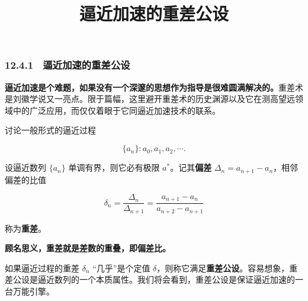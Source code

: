 \documentclass[
  10pt,
  fontset=fandol]{ctexart}
\title{逼近加速的重差公设}
\author{}
\date{}
\begin{document}
\maketitle

\subsubsection{12.4.1　逼近加速的重差公设}\label{ux903cux8fd1ux52a0ux901fux7684ux91cdux5deeux516cux8bbe}

\textbf{逼近加速是个难题，如果没有一个深邃的思想作为指导是很难圆满解决的。}重差术是刘徽学说又一亮点。限于篇幅，这里避开重差术的历史渊源以及它在测高望远领域中的广泛应用，而仅仅着眼于它同逼近加速技术的联系。

讨论一般形式的逼近过程

\[
\{a_n\}:a_0,a_1,a_2,\cdots.
\]

设逼近数列 \(\{a_n\}\) 单调有界，则它必有极限 \(a^*\)。记其\textbf{偏差} \(\Delta_n=a_{n+1}-a_n\)，相邻偏差的比值

\[
\delta_n=\frac{\Delta_n}{\Delta_{n+1}}=\frac{a_{n+1}-a_n}{a_{n+2}-a_{n+1}}
\]

称为\textbf{重差}。

\textbf{顾名思义，重差就是差数的重叠，即偏差比。}

如果逼近过程的重差 \(\delta_n\) ``几乎''是个定值 \(\delta\)，则称它满足\textbf{重差公设}。容易想象，重差公设是逼近数列的一个本质属性。我们将会看到，重差公设是保证逼近加速的一台万能引擎。
\end{document}
